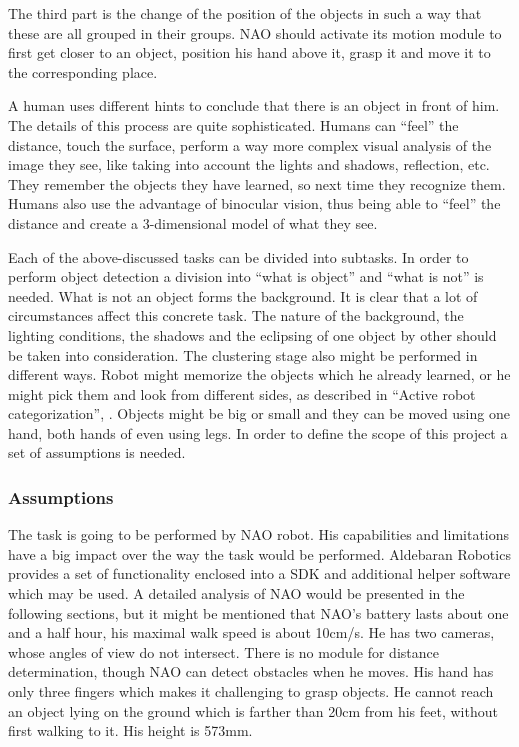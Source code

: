         The third part is the change of the position of the objects in such a way that these are all grouped in their groups. NAO should activate its motion module to first get closer to an object, position his hand above it, grasp it and move it to the corresponding place. 

A human uses different hints to conclude that there is an object in front of him. The details of this process are quite sophisticated. Humans can ``feel'' the distance, touch the surface, perform a way more complex visual analysis of the image they see, like taking into account the lights and shadows, reflection, etc. They remember the objects they have learned, so next time they recognize them. Humans also use the advantage of binocular vision, thus being able to “feel” the distance and create a 3-dimensional model of what they see.

Each of the above-discussed tasks can be divided into subtasks. In order to perform object detection a division into ``what is object'' and ``what is not'' is needed. What is not an object forms the background. It is clear that a lot of circumstances affect this concrete task. The nature of the background, the lighting conditions, the shadows and the eclipsing of one object by other should be taken into consideration. The clustering stage also might be performed in different ways. Robot might memorize the objects which he already learned, or he might pick them and look from different sides, as described in ``Active robot categorization'', \cite{categorization}. Objects might be big or small and they can be moved using one hand, both hands of even using legs. In order to define the scope of this project a set of assumptions is needed.

    \subsubsection{Assumptions}
        The task is going to be performed by NAO robot. His capabilities and limitations have a big impact over the way the task would be performed. Aldebaran Robotics provides a set of functionality enclosed into a SDK and additional helper software which may be used. A detailed analysis of NAO would be presented in the following sections, but it might be mentioned that NAO’s battery lasts about one and a half hour, his maximal walk speed is about 10cm/s. He has two cameras, whose angles of view do not intersect. There is no module for distance determination, though NAO can detect obstacles when he moves. His hand has only three fingers which makes it challenging to grasp objects. He cannot reach an object lying on the ground which is farther than 20cm from his feet, without first walking to it. His height is 573mm.

